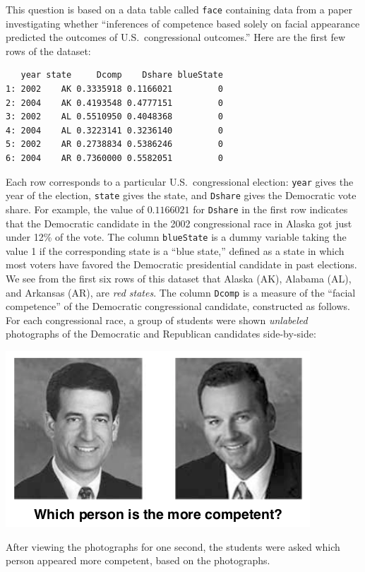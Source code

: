 \documentclass[addpoints,12pt]{exam}
\begin{document}
\begin{questions}
  \question This question is based on a data table called \texttt{face} containing data from a paper investigating whether ``inferences of competence based solely on facial appearance predicted the outcomes of U.S.\ congressional outcomes.''
  Here are the first few rows of the dataset:
\begin{verbatim}
   year state     Dcomp    Dshare blueState
1: 2002    AK 0.3335918 0.1166021         0
2: 2004    AK 0.4193548 0.4777151         0
3: 2002    AL 0.5510950 0.4048368         0
4: 2004    AL 0.3223141 0.3236140         0
5: 2002    AR 0.2738834 0.5386246         0
6: 2004    AR 0.7360000 0.5582051         0
\end{verbatim}
Each row corresponds to a particular U.S.\ congressional election: \texttt{year} gives the year of the election, \texttt{state} gives the state, and \texttt{Dshare} gives the Democratic vote share.
For example, the value of $0.1166021$ for \texttt{Dshare} in the first row indicates that the Democratic candidate in the 2002 congressional race in Alaska got just under 12\% of the vote.
The column \texttt{blueState} is a dummy variable taking the value 1 if the corresponding state is a ``blue state,'' defined as a state in which most voters have favored the Democratic presidential candidate in past elections.
We see from the first six rows of this dataset that Alaska (AK), Alabama (AL), and Arkansas (AR), are \emph{red states}.
The column \texttt{Dcomp} is a measure of the ``facial competence'' of the Democratic congressional candidate, constructed as follows.
For each congressional race, a group of students were shown \emph{unlabeled} photographs of the Democratic and Republican candidates side-by-side:
\begin{center}
  \includegraphics[scale = 0.4]{facial-competence.png}
\end{center}
After viewing the photographs for one second, the students were asked which person appeared more competent, based on the photographs.

\end{questions}
\end{document}
